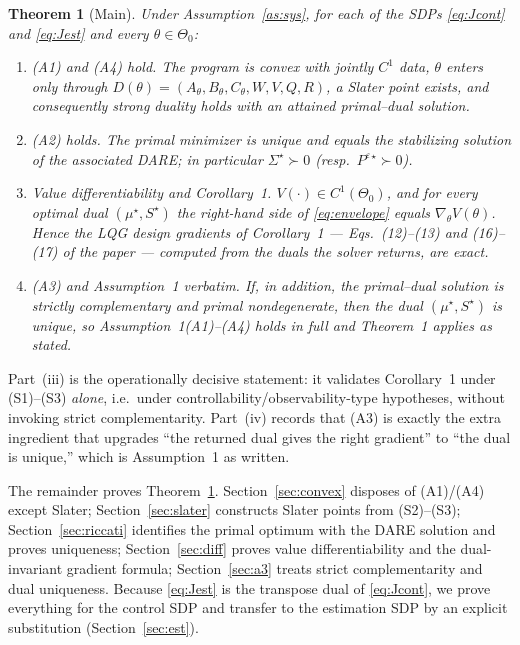 \documentclass[11pt]{article}
\newtheorem{theorem}{Theorem}
\theoremstyle{definition}
\newcommand{\Th}{\theta}
\newcommand{\Nbhd}{\Theta_{0}}
\newcommand{\Sig}{\Sigma}
\newcommand{\Pe}{P^{\varepsilon}}
\begin{document}
\begin{theorem}[Main]\label{thm:main}
Under Assumption~\ref{as:sys}, for each of the SDPs \eqref{eq:Jcont} and
\eqref{eq:Jest} and every $\Th\in\Nbhd$:
\begin{enumerate}
\item[\textup{(i)}] \emph{(A1) and (A4) hold.} The program is convex with jointly
$C^1$ data, $\Th$ enters only through $D(\Th)=(A_\Th,B_\Th,C_\Th,W,V,Q,R)$, a
Slater point exists, and consequently strong duality holds with an attained
primal--dual solution.
\item[\textup{(ii)}] \emph{(A2) holds.} The primal minimizer is unique and equals
the stabilizing solution of the associated DARE; in particular
$\Sig^\star\succ0$ (resp.\ $\Pe{}^{\star}\succ0$).
\item[\textup{(iii)}] \emph{Value differentiability and Corollary~1.}
$V(\cdot)\in C^1(\Nbhd)$, and for \emph{every} optimal dual
$(\mu^\star,S^\star)$ the right-hand side of \eqref{eq:envelope} equals
$\nabla_\Th V(\Th)$. Hence the LQG design gradients of Corollary~1
--- Eqs.~(12)--(13) and (16)--(17) of the paper --- computed from the duals the
solver returns, are exact.
\item[\textup{(iv)}] \emph{(A3) and Assumption~1 verbatim.} If, in addition,
the primal--dual solution is strictly complementary and primal nondegenerate,
then the dual $(\mu^\star,S^\star)$ is unique, so Assumption~1(A1)--(A4) holds in
full and Theorem~1 applies as stated.
\end{enumerate}
\end{theorem}

Part~(iii) is the operationally decisive statement: it validates Corollary~1
under (S1)--(S3) \emph{alone}, i.e.\ under controllability/observability-type
hypotheses, without invoking strict complementarity. Part~(iv) records that
(A3) is exactly the extra ingredient that upgrades ``the returned dual gives the
right gradient'' to ``the dual is unique,'' which is Assumption~1 as written.

The remainder proves Theorem~\ref{thm:main}. Section~\ref{sec:convex} disposes of
(A1)/(A4) except Slater; Section~\ref{sec:slater} constructs Slater points from
(S2)--(S3); Section~\ref{sec:riccati} identifies the primal optimum with the DARE
solution and proves uniqueness; Section~\ref{sec:diff} proves value
differentiability and the dual-invariant gradient formula;
Section~\ref{sec:a3} treats strict complementarity and dual uniqueness. Because
\eqref{eq:Jest} is the transpose dual of \eqref{eq:Jcont}, we prove everything
for the control SDP and transfer to the estimation SDP by an explicit
substitution (Section~\ref{sec:est}).
\end{document}
